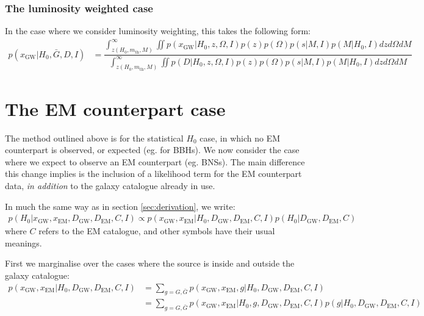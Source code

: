\documentclass[a4paper,10pt]{article}
\begin{document}
{\subsubsection{The luminosity weighted case}
In the case where we consider luminosity weighting, this takes the following form:
\begin{equation}
\begin{aligned}
p(x_{\text{GW}}|H_0,\bar{G},D,I) &= \dfrac{\int^\infty_{z(H_0,m_{\text{th}},M)} \iint p(x_{\text{GW}}|H_0,z,\Omega,I) p(z) p(\Omega) p(s|M,I) p(M|H_0,I) dz d\Omega dM}{\int^\infty_{z(H_0,m_{\text{th}},M)} \iint p(D|H_0,z,\Omega,I) p(z) p(\Omega) p(s|M,I) p(M|H_0,I) dz d\Omega dM}
\end{aligned}
\end{equation}





\section{The EM counterpart case}
The method outlined above is for the statistical $H_0$ case, in which no EM counterpart is observed, or expected (eg. for BBHs).  We now consider the case where we expect to observe an EM counterpart (eg. BNSs).  The main difference this change implies is the inclusion of a likelihood term for the EM counterpart data, \emph{in addition} to the galaxy catalogue already in use.

In much the same way as in section \ref{sec:derivation}, we write:
\begin{equation}
\begin{aligned}
p(H_0|x_{\text{GW}},x_{\text{EM}},D_{\text{GW}},D_{\text{EM}},C,I) \propto p(x_{\text{GW}},x_{\text{EM}}|H_0,D_{\text{GW}},D_{\text{EM}},C,I) p(H_0|D_{\text{GW}},D_{\text{EM}},C)
\end{aligned} 
\end{equation}
where $C$ refers to the EM catalogue, and other symbols have their usual meanings.

First we marginalise over the cases where the source is inside and outside the galaxy catalogue:
\begin{equation}
\begin{aligned}
p(x_{\text{GW}},x_{\text{EM}}|H_0,D_{\text{GW}},D_{\text{EM}},C,I) &= \sum_{g=G,\bar{G}} p(x_{\text{GW}},x_{\text{EM}},g|H_0,D_{\text{GW}},D_{\text{EM}},C,I)
\\ &= \sum_{g=G,\bar{G}} p(x_{\text{GW}},x_{\text{EM}}|H_0,g,D_{\text{GW}},D_{\text{EM}},C,I) p(g|H_0,D_{\text{GW}},D_{\text{EM}},C,I)
\end{aligned} 
\end{equation}

}
\end{document}
